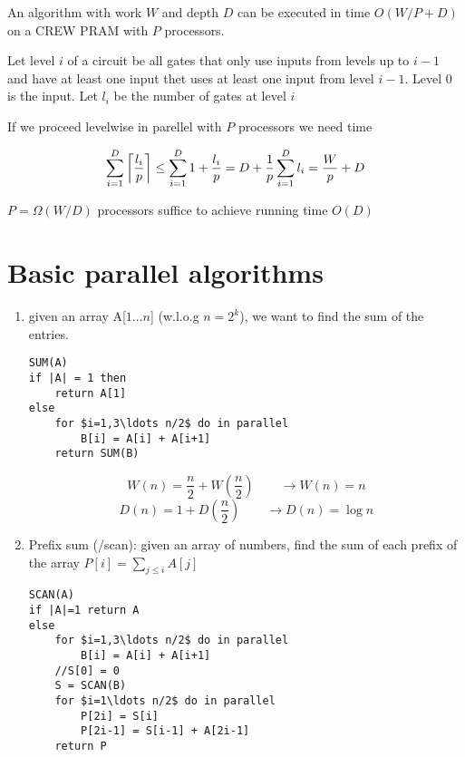 \begin{thm} An algorithm with work $W$ and depth $D$ can be executed in time $O(W/P+D)$ on a CREW PRAM with $P$ processors.\end{thm}

\begin{pr} Let level $i$ of a circuit be all gates that only use inputs from levels up to $i-1$ and have at least one input thet uses at least one input from level $i-1$. Level 0 is the input. Let $l_i$ be the number of gates at level $i$

If we proceed levelwise in parellel with $P$ processors we need time

\[\sum_{i=1}^D \left\lceil \frac{l_i}{p} \right\rceil\leq \sum_{i=1}^D 1+\frac{l_i}{p} = D+\frac 1p \sum_{i=1}^D l_i = \frac Wp +D\]

\end{pr}

\begin{cor} $P= \Omega(W/D)$ processors suffice to achieve running time $O(D)$\end{cor}

\section{Basic parallel algorithms}

\begin{enumerate}
\item given an array A[$1\ldots n$] (w.l.o.g $n=2^k$), we want to find the sum of the entries. 

\begin{lstlisting}
SUM(A) 
if |A| = 1 then
	return A[1]
else
	for $i=1,3\ldots n/2$ do in parallel
		B[i] = A[i] + A[i+1]
	return SUM(B)
\end{lstlisting}

\[W(n) = \frac n2 + W(\frac n2) \qquad \rightarrow W(n) = n\]
\[D(n) = 1 + D(\frac n2) \qquad \rightarrow D(n) = \log n\]
\item Prefix sum (/scan): given an array of numbers, find the sum of each prefix of the array $P[i] = \sum_{j\leq i} A[j]$

\begin{lstlisting}
SCAN(A)
if |A|=1 return A
else
	for $i=1,3\ldots n/2$ do in parallel
		B[i] = A[i] + A[i+1]
	//S[0] = 0
	S = SCAN(B)
	for $i=1\ldots n/2$ do in parallel
		P[2i] = S[i]
		P[2i-1] = S[i-1] + A[2i-1]
	return P
\end{lstlisting}

\end{enumerate}
